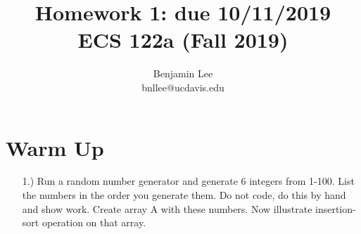 \documentclass[11pt]{article}
\title{\bf Homework 1: due 10/11/2019\\[2ex]
	\rm\normalsize ECS 122a (Fall 2019)}
\author{Benjamin Lee\\bnllee@ucdavis.edu}
\begin{document}
	\maketitle
	
	
	\section*{Warm Up} 
	\begin{itemize}
		\item [1.)] Run a random number generator and generate 6 integers from 1-100. List the numbers in the
		order you generate them.
		Do not code, do this by hand and show work.
		Create array A with these numbers. Now illustrate insertion-sort operation on that array.
	\end{itemize}
\end{document}

